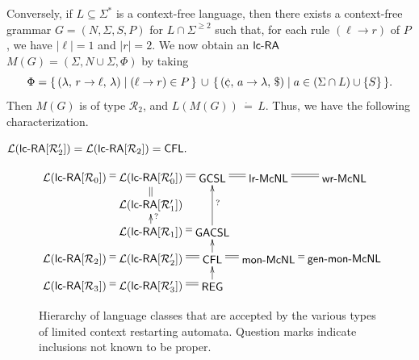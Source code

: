 Conversely, if $L\subseteq\Sigma^*$ is a context-free language, then there exists a context-free grammar $G=(N,\Sigma,S,P)$ for $L\cap\Sigma^{\ge 2}$ such that, for each rule $(\ell\to r)$ of $P$, we have $|\ell|=1$ and $|r|=2$. We now obtain an $\lcRA$ $M(G)=(\Sigma,N\cup\Sigma,\Phi)$ by taking
$$\Phi = \{\,\rarule{\lambda}{r}{\ell}{\lambda}\mid (\ell\to r)\in P\,\}\,\cup\,
         \{\,\rarule{\cent}{a}{\lambda}{\$}\mid a\in(\Sigma\cap L)\cup\{S\}\,\}.$$
Then $M(G)$ is of type $\mathcal{R}_2$, and $L(M(G))\,\dot{=}\,L$. Thus, we have the following characterization.
\begin{theorem}\label{PropR2}
${\mathcal L}(\lcRAp[2]) = {\mathcal L}(\lcRA[2]) = \CFL.$
\end{theorem}

\begin{figure}
{\small
\[ \xymatrix@R8pt@C5pt{
\txt{${\mathcal L}(\textup{\sf lc-RA}[{\mathcal R}_0])$}\ar@{=}[r] &
\txt{${\mathcal L}(\textup{\sf lc-RA}[{\mathcal R}_0'])$}\ar@{=}[r] & \txt{\sf GCSL} \ar@{=}[r]
                   & \txt{$\textup{\sf lr-McNL}$}\ar@{=}[r] & \txt{$\textup{\sf wr-McNL}$}\\
                                                           &
\txt{${\mathcal L}(\textup{\sf lc-RA}[{\mathcal R}_1'])$}\ar@{=}[u]  \\
                                                           &
\txt{${\mathcal L}(\textup{\sf lc-RA}[{\mathcal R}_1])$} \ar@{->}_?[u]  
                   & \txt{\sf GACSL}\ar@{=}[l]\ar@{->}_?[uu]\\
\txt{${\mathcal L}(\textup{\sf lc-RA}[{\mathcal R}_2])$}\ar@{=}[r] &
\txt{${\mathcal L}(\textup{\sf lc-RA}[{\mathcal R}_2'])$}\ar@{=}[r] &
\txt{\sf CFL}\ar@{->}[u]\ar@{=}[r] 
& \txt{$\textup{\sf mon-McNL}$}\ar@{=}[r] & \txt{$\textup{\sf gen-mon-McNL}$}\\
\txt{${\mathcal L}(\textup{\sf lc-RA}[{\mathcal R}_3])$}\ar@{=}[r] &
\txt{${\mathcal L}(\textup{\sf lc-RA}[{\mathcal R}_3'])$}\ar@{=}[r] &
\txt{\sf REG}\ar@{->}[u]\\
}
\]
\caption{Hierarchy of language classes that are accepted by the various types of
limited context restarting automata.
Question marks indicate inclusions not known to be proper.}\label{Fig1}
}
\end{figure}

